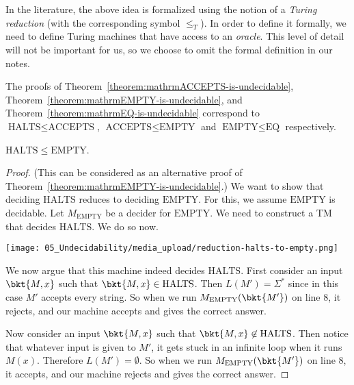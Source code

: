 \begin{note} \label{note:Turing-reductions}
In the literature, the above idea is formalized using the notion of a \emph{Turing reduction} (with the corresponding symbol $\leq_T$). In order to define it formally, we need to define Turing machines that have access to an \emph{oracle}. This level of detail will not be important for us, so we choose to omit the formal definition in our notes.
\end{note}


\begin{note} \label{note:Already-established-reductions}
The proofs of Theorem~\ref{theorem:mathrmACCEPTS-is-undecidable}, Theorem~\ref{theorem:mathrmEMPTY-is-undecidable}, and Theorem~\ref{theorem:mathrmEQ-is-undecidable} correspond to $\text{HALTS} \leq \text{ACCEPTS}$, $\text{ACCEPTS} \leq \text{EMPTY}$ and $\text{EMPTY} \leq \text{EQ}$ respectively.
\end{note}


\begin{flex}
\begin{theorem} \label{theorem:mathrmHALTS-leq-mathrmEMPTY}
$\mathrm{HALTS} \leq \mathrm{EMPTY}$.
\end{theorem}

\begin{proof}
(This can be considered as an alternative proof of Theorem~\ref{theorem:mathrmEMPTY-is-undecidable}.) We want to show that deciding $\text{HALTS}$ reduces to deciding $\text{EMPTY}$. For this, we assume $\text{EMPTY}$ is decidable. Let $M_\text{EMPTY}$ be a decider for $\text{EMPTY}$. We need to construct a TM that decides $\text{HALTS}$. We do so now.

\begin{center}
\texttt{[image: 05\_Undecidability/media\_upload/reduction-halts-to-empty.png]}
\end{center}

We now argue that this machine indeed decides $\text{HALTS}$. First consider an input $\bkt{M,x}$ such that $\bkt{M,x} \in \text{HALTS}$. Then $L(M') = \Sigma^*$ since in this case $M'$ accepts every string. So when we run $M_\text{EMPTY}(\bkt{M'})$ on line 8, it rejects, and our machine accepts and gives the correct answer. 

Now consider an input $\bkt{M,x}$ such that $\bkt{M,x} \not \in \text{HALTS}$. Then notice that whatever input is given to $M'$, it gets stuck in an infinite loop when it runs $M(x)$. Therefore $L(M')= \emptyset$. So when we run $M_\text{EMPTY}(\bkt{M'})$ on line 8, it accepts, and our machine rejects and gives the correct answer.
\end{proof}
\end{flex}



